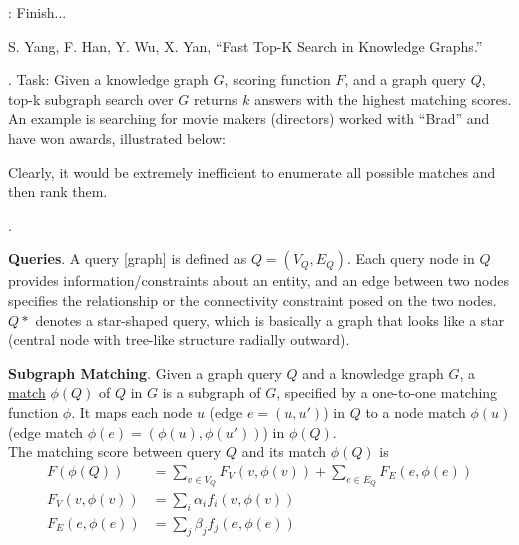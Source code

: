 \documentclass[11pt]{article}
\begin{document}
: Finish...


\vspace{-1em}
{\footnotesize S. Yang, F. Han, Y. Wu, X. Yan, ``Fast Top-K Search in Knowledge Graphs.''}

\p {}. Task: Given a knowledge graph $G$, scoring function $F$, and a graph query $Q$, top-k subgraph search over $G$ returns $k$ answers with the highest matching scores. An example is searching for movie makers (directors) worked with ``Brad'' and have won awards, illustrated below:

Clearly, it would be extremely inefficient to enumerate all possible matches and then rank them.

\myspace
\p {}.
\begin{compactitem}
	\item \textbf{Queries}. A query [graph] is defined as $Q = (V_Q, E_Q)$. Each query node in $Q$ provides information/constraints about an entity, and an edge between two nodes specifies the relationship or the connectivity constraint posed on the two nodes. $Q*$ denotes a star-shaped query, which is basically a graph that looks like a star (central node with tree-like structure radially outward). 
	
	\item \textbf{Subgraph Matching}. Given a graph query $Q$ and a knowledge graph $G$, a \underline{match} $\phi(Q)$ of $Q$ in $G$ is a subgraph of $G$, specified by a one-to-one matching function $\phi$. It maps each node $u$ (edge $e=(u, u')$) in $Q$ to a node match $\phi(u)$ (edge match $\phi(e)=(\phi(u), \phi(u'))$) in $\phi(Q)$. \\
	
	\p The matching score between query $Q$ and its match $\phi(Q)$ is
	\begin{align}
	F(\phi(Q)) &= \sum_{v \in V_Q} F_V(v, \phi(v)) + \sum_{e \in E_Q} F_E(e, \phi(e)) \\
	F_V(v, \phi(v)) &= \sum_i \alpha_i f_i(v, \phi(v)) \\
	F_E(e, \phi(e)) &= \sum_j \beta_j f_j(e, \phi(e))
	\end{align}
\end{compactitem}
\end{document}
